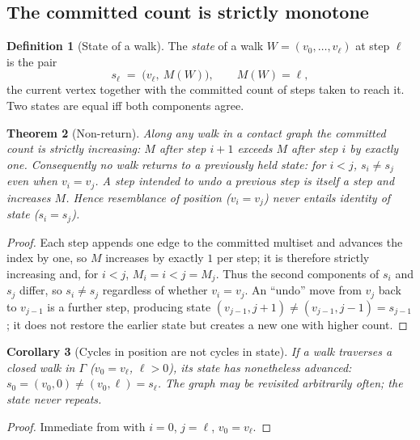 \documentclass[11pt,a4paper]{article}
\theoremstyle{thmstyle}
\newtheorem{theorem}{Theorem}[section]
\newtheorem{corollary}[theorem]{Corollary}
\theoremstyle{definition}
\newtheorem{definition}[theorem]{Definition}
\theoremstyle{remark}
\newcommand{\Gph}{\Gamma}                 %
\newcommand{\Walk}{W}                     %
\newcommand{\rec}{M}                      %
\begin{document}
\subsection{The committed count is strictly monotone}

\begin{definition}[State of a walk]
\label{def:state}
The \emph{state} of a walk $\Walk=(v_0,\dots,v_\ell)$ at step $\ell$ is the pair
\[
s_\ell\;=\;\bigl(v_\ell,\ \rec(\Walk)\bigr),\qquad \rec(\Walk)=\ell,
\]
the current vertex together with the committed count of steps taken to reach it.
Two states are equal iff both components agree.
\end{definition}

\begin{theorem}[Non-return]
\label{thm:nonreturn}
Along any walk in a contact graph the committed count is strictly increasing:
$\rec$ after step $i+1$ exceeds $\rec$ after step $i$ by exactly one. Consequently
no walk returns to a previously held state: for $i<j$, $s_i\neq s_j$ even when
$v_i=v_j$. A step intended to undo a previous step is itself a step and increases
$\rec$. Hence resemblance of position \textup{(}$v_i=v_j$\textup{)} never entails
identity of state \textup{(}$s_i=s_j$\textup{)}.
\end{theorem}

\begin{proof}
Each step appends one edge to the committed multiset and advances the index by
one, so $\rec$ increases by exactly $1$ per step; it is therefore strictly
increasing and, for $i<j$, $\rec_i=i<j=\rec_j$. Thus the second components of
$s_i$ and $s_j$ differ, so $s_i\neq s_j$ regardless of whether $v_i=v_j$. An
``undo'' move from $v_j$ back to $v_{j-1}$ is a further step, producing state
$(v_{j-1},j{+}1)\neq(v_{j-1},j{-}1)=s_{j-1}$; it does not restore the earlier
state but creates a new one with higher count.
\end{proof}

\begin{corollary}[Cycles in position are not cycles in state]
\label{cor:cycles}
If a walk traverses a closed walk in $\Gph$ \textup{(}$v_0=v_\ell$, $\ell>0$\textup{)},
its state has nonetheless advanced: $s_0=(v_0,0)\neq(v_0,\ell)=s_\ell$. The graph
may be revisited arbitrarily often; the state never repeats.
\end{corollary}

\begin{proof}
Immediate from  with $i=0$, $j=\ell$, $v_0=v_\ell$.
\end{proof}
\end{document}
